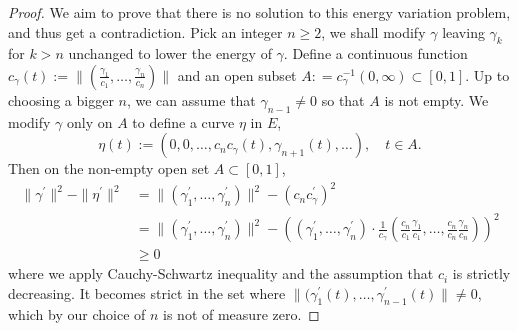 \begin{proof}
	We aim to prove that there is no solution to this energy variation problem,
	and thus get a contradiction.
	Pick an integer $n \geq 2$,
	we shall modify $\gamma$ leaving $\gamma_k$ for $ k > n$ unchanged to lower the energy of $\gamma$.
	Define a continuous function
	$ c_{\gamma}(t) := \|(\frac{\gamma_1}{c_1}, \ldots, \frac{\gamma_n}{c_n} )\|$
	and an open subset $A: = c_\gamma^{-1}(0, \infty) \subset [0,1]$.
	Up to choosing a bigger $n$,
	we can assume that $ \gamma_{n-1} \neq 0$ so that $A$ is not empty.
	We modify $\gamma$ only on $A$ to define a curve $\eta$ in $E$,
	\[
		\eta(t) := (0,0,\ldots, c_n c_{\gamma}(t),\gamma_{n+1}(t),\ldots),\quad t \in A.
	\]
	Then on the non-empty open set $A \subset [0,1]$,
	\begin{align*}
		\| \gamma^\prime \|^2 - \| \eta^\prime \|^2 & =
		\|( \gamma_1^\prime,\ldots, \gamma_n^\prime )\|^2- (c_n c_\gamma^\prime)^2                         \\
		                                            & = \|( \gamma_1^\prime,\ldots, \gamma_n^\prime )\|^2-
		((\gamma_1^\prime, \ldots, \gamma_n^\prime) \cdot \frac{1}{c_\gamma}
		(\frac{c_n}{c_1} \frac{\gamma_1}{c_1}, \ldots, \frac{c_n}{c_n} \frac{\gamma_n}{c_n}))^2            \\
		                                            & \geq 0
	\end{align*}
	where we apply Cauchy-Schwartz inequality and the assumption that $c_i$ is strictly decreasing.
	It becomes strict in the set where $\| (\gamma_1^\prime(t), \ldots, \gamma_{n-1}^\prime(t)\| \ne 0$,
	which by our choice of $n$ is not of measure zero.
\end{proof}
